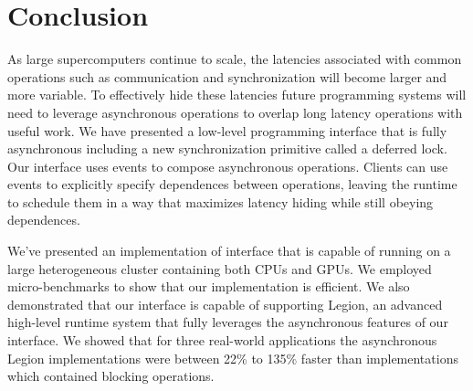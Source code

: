 
\section{Conclusion}
\label{sec:conclusion}

As large supercomputers continue to scale, the latencies associated
with common operations such as communication and synchronization will
become larger and more variable.  To effectively hide these latencies
future programming systems will need to leverage asynchronous operations
to overlap long latency operations with useful work.  We have
presented a low-level programming interface that is fully asynchronous
including a new synchronization primitive called a deferred lock.
Our interface uses events to compose asynchronous operations.  Clients
can use events to explicitly specify dependences between operations,
leaving the runtime to schedule them in a way that maximizes latency 
hiding while still obeying dependences.

We've presented an implementation of interface that is capable of running
on a large heterogeneous cluster containing both CPUs and GPUs.  We
employed micro-benchmarks to show that our implementation is efficient.
We also demonstrated that our interface is capable of supporting Legion,
an advanced high-level runtime system that fully leverages the asynchronous
features of our interface.  We showed that for three real-world applications
the asynchronous Legion implementations were between 22\% to 135\% faster than
implementations which contained blocking operations.


